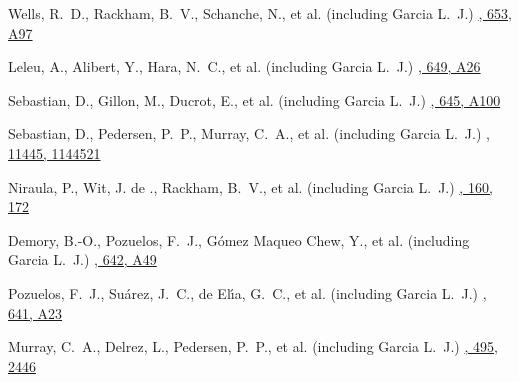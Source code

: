 {Wells, R.~D., Rackham, B.~V., Schanche, N., et al. (including Garcia L.~J.)}
{\href{https://ui.adsabs.harvard.edu/abs/2021A\&A...653A..97W}{\aap, 653, A97}}

{Leleu, A., Alibert, Y., Hara, N.~C., et al. (including Garcia L.~J.)}
{\href{https://ui.adsabs.harvard.edu/abs/2021A\&A...649A..26L}{\aap, 649, A26}}

{Sebastian, D., Gillon, M., Ducrot, E., et al. (including Garcia L.~J.)}
{\href{https://ui.adsabs.harvard.edu/abs/2021A\&A...645A.100S}{\aap, 645, A100}}

{Sebastian, D., Pedersen, P.~P., Murray, C.~A., et al. (including Garcia L.~J.)}
{\href{https://ui.adsabs.harvard.edu/abs/2020SPIE11445E..21S}{\procspie, 11445, 1144521}}

{Niraula, P., Wit, J. de ., Rackham, B.~V., et al. (including Garcia L.~J.)}
{\href{https://ui.adsabs.harvard.edu/abs/2020AJ....160..172N}{\aj, 160, 172}}

{Demory, B.-O., Pozuelos, F.~J., G{\'o}mez Maqueo Chew, Y., et al. (including Garcia L.~J.)}
{\href{https://ui.adsabs.harvard.edu/abs/2020A\&A...642A..49D}{\aap, 642, A49}}

{Pozuelos, F.~J., Su{\'a}rez, J.~C., de El{\'\i}a, G.~C., et al. (including Garcia L.~J.)}
{\href{https://ui.adsabs.harvard.edu/abs/2020A\&A...641A..23P}{\aap, 641, A23}}

{Murray, C.~A., Delrez, L., Pedersen, P.~P., et al. (including Garcia L.~J.)}
{\href{https://ui.adsabs.harvard.edu/abs/2020MNRAS.495.2446M}{\mnras, 495, 2446}}